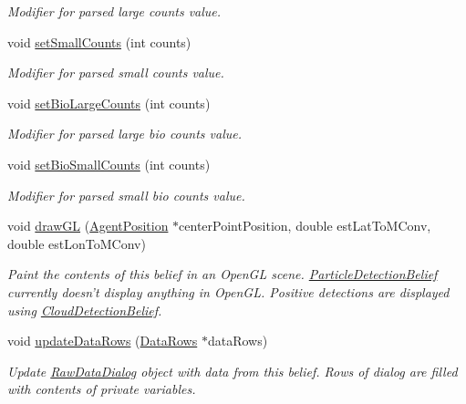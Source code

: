 \begin{DoxyCompactItemize}
\begin{DoxyCompactList}\small\item\em Modifier for parsed large counts value. \end{DoxyCompactList}\item 
void \hyperlink{class_particle_detection_belief_a92f6ba82b9789da6d8afea7fd0474ac5}{setSmallCounts} (int counts)
\begin{DoxyCompactList}\small\item\em Modifier for parsed small counts value. \end{DoxyCompactList}\item 
void \hyperlink{class_particle_detection_belief_aa79810f97904026f245dc96f24b6ae24}{setBioLargeCounts} (int counts)
\begin{DoxyCompactList}\small\item\em Modifier for parsed large bio counts value. \end{DoxyCompactList}\item 
void \hyperlink{class_particle_detection_belief_a089cfca70b6c8ff01b8ac998d3ce8a68}{setBioSmallCounts} (int counts)
\begin{DoxyCompactList}\small\item\em Modifier for parsed small bio counts value. \end{DoxyCompactList}\item 
void \hyperlink{class_particle_detection_belief_a72b09756119c7c94db4fcb6db5534104}{drawGL} (\hyperlink{class_agent_position}{AgentPosition} $\ast$centerPointPosition, double estLatToMConv, double estLonToMConv)
\begin{DoxyCompactList}\small\item\em Paint the contents of this belief in an OpenGL scene. \hyperlink{class_particle_detection_belief}{ParticleDetectionBelief} currently doesn't display anything in OpenGL. Positive detections are displayed using \hyperlink{class_cloud_detection_belief}{CloudDetectionBelief}. \end{DoxyCompactList}\item 
void \hyperlink{class_particle_detection_belief_a16879c7ebd0a461297bc6064e0562b7a}{updateDataRows} (\hyperlink{struct_data_rows}{DataRows} $\ast$dataRows)
\begin{DoxyCompactList}\small\item\em Update \hyperlink{class_raw_data_dialog}{RawDataDialog} object with data from this belief. Rows of dialog are filled with contents of private variables. \end{DoxyCompactList}\end{DoxyCompactItemize}
